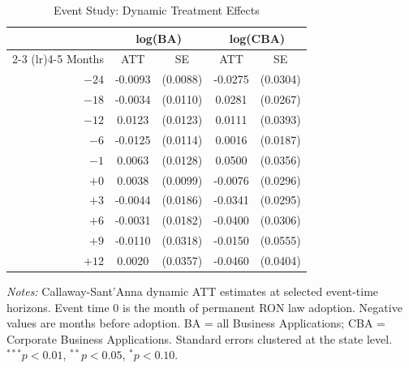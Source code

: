 \begin{table}[t]
\centering
\caption{Event Study: Dynamic Treatment Effects}
\label{tab:eventstudy}
\begin{tabular}{r cc cc}
\hline\hline
 & \multicolumn{2}{c}{log(BA)} & \multicolumn{2}{c}{log(CBA)} \\
\cmidrule(lr){2-3} \cmidrule(lr){4-5}
Months & ATT & SE & ATT & SE \\
\hline
$-24$ & -0.0093 & (0.0088) & -0.0275 & (0.0304) \\
$-18$ & -0.0034 & (0.0110) & 0.0281 & (0.0267) \\
$-12$ & 0.0123 & (0.0123) & 0.0111 & (0.0393) \\
$-6$ & -0.0125 & (0.0114) & 0.0016 & (0.0187) \\
$-1$ & 0.0063 & (0.0128) & 0.0500 & (0.0356) \\
$+0$ & 0.0038 & (0.0099) & -0.0076 & (0.0296) \\
$+3$ & -0.0044 & (0.0186) & -0.0341 & (0.0295) \\
$+6$ & -0.0031 & (0.0182) & -0.0400 & (0.0306) \\
$+9$ & -0.0110 & (0.0318) & -0.0150 & (0.0555) \\
$+12$ & 0.0020 & (0.0357) & -0.0460 & (0.0404) \\
\hline\hline
\end{tabular}
\begin{tablenotes}[flushleft]
\small
\item \textit{Notes:} Callaway-Sant'Anna dynamic ATT estimates at selected event-time horizons. Event time 0 is the month of permanent RON law adoption. Negative values are months before adoption. BA = all Business Applications; CBA = Corporate Business Applications. Standard errors clustered at the state level. $^{***}p<0.01$, $^{**}p<0.05$, $^{*}p<0.10$.
\end{tablenotes}
\end{table}

